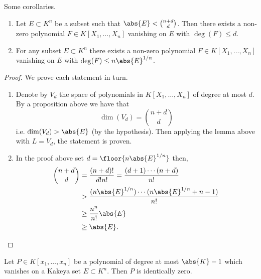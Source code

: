 \documentclass[12pt, a4paper]{article}
\begin{document}
\begin{mdcor}
    Some corollaries.
    \begin{enumerate}
        \item Let \(E \subset K^n\) be a subset such that \(\abs{E} < \binom{n+d}{d}\). Then there exists a non-zero polynomial \(F \in K[X_1,\ldots,X_n]\) vanishing on \(E\) with \(\deg(F)\leq d\).
        \item For any subset \(E \subset K^n\) there exists a non-zero polynomial \(F \in K[X_1,\ldots,X_n]\) vanishing on \(E\) with \(\deg(F) \leq n \abs{E}^{1/n}\).
    \end{enumerate}
\end{mdcor}

\begin{proof}
    We prove each statement in turn.
    \begin{enumerate}
        \item Denote by \(V_d\) the space of polynomials in \(K[X_1,\ldots,X_n]\) of degree at most \(d\). By a proposition above we have that 
        \[\dim(V_d) = \binom{n+d}{d}\]
        i.e. \(\dim(V_d) > \abs{E}\) (by the hypothesis). Then applying the lemma above with \(L=V_d\), the statement is proven.
        \item In the proof above set \(d = \floor{n \abs{E}^{1/n}}\) then, 
        \[\begin{aligned}
            \binom{n+d}{d} &= \frac{(n+d)!}{d!n!} = \frac{(d+1)\cdots(n+d)}{n!} \\
            &> \frac{(n \abs{E}^{1/n}) \cdots (n \abs{E}^{1/n}+n-1)}{n!} \\
            &\geq \frac{n^n}{n!}\abs{E} \\
            &\geq \abs{E}.
        \end{aligned}\]
    \end{enumerate}
\end{proof}

\begin{mdlemma}
    Let \(P \in K[x_1,\ldots,x_n]\) be a polynomial of degree at most \(\abs{K}-1\) which vanishes on a Kakeya set \(E \subset K^n\). Then \(P\) is identically zero.
\end{mdlemma}
\end{document}
